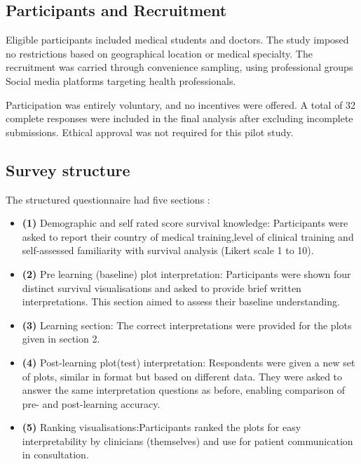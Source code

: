 \documentclass[
  onecolumn]{article}
\begin{document}
\subsection{Participants and
Recruitment}\label{participants-and-recruitment}

Eligible participants included medical students and doctors. The study
imposed no restrictions based on geographical location or medical
specialty. The recruitment was carried through convenience sampling,
using professional groups Social media platforms targeting health
professionals.

Participation was entirely voluntary, and no incentives were offered. A
total of 32 complete responses were included in the final analysis after
excluding incomplete submissions. Ethical approval was not required for
this pilot study.

\subsection{Survey structure}\label{survey-structure}

The structured questionnaire had five sections :

\begin{itemize}
\item \textbf{(1)} Demographic and self rated score survival knowledge: Participants were asked to report their country of medical training,level of clinical training and self-assessed familiarity with survival analysis (Likert scale 1 to 10).
\item \textbf{(2)} Pre learning (baseline) plot interpretation: Participants were shown four distinct survival visualisations and asked to provide brief written interpretations. This  section aimed to assess their baseline understanding. 
\item \textbf{(3)} Learning section: The correct interpretations were provided for the plots given in section 2.
\item \textbf{(4)} Post-learning plot(test) interpretation: Respondents were given a new set of plots, similar in format but based on different data. They were asked to answer the same interpretation questions as before,
enabling comparison of pre- and post-learning accuracy. 
\item \textbf{(5)} Ranking visualisations:Participants ranked the plots for easy interpretability by clinicians (themselves) and use for patient communication in consultation.

\end{itemize}
\end{document}
